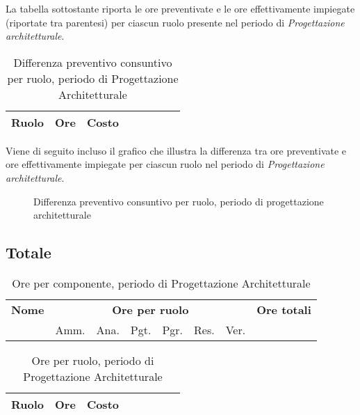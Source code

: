 La tabella sottostante riporta le ore preventivate e le ore effettivamente impiegate (riportate tra parentesi) per ciascun ruolo presente nel periodo di \textit{Progettazione architetturale}.

\begin{table}[H]
\begin{tabular}{lccccccc}
\toprule
    \textbf{Ruolo}  & \textbf{Ore} & \textbf{Costo} \\
    \midrule
    
    	
    
    \bottomrule
\end{tabular}
\caption{Differenza preventivo consuntivo per ruolo, periodo di Progettazione Architetturale}
\end{table}

Viene di seguito incluso il grafico che illustra la differenza tra ore preventivate e ore effettivamente impiegate per ciascun ruolo nel periodo di \textit{Progettazione architetturale}.

\begin{center}
\begin{figure}[H]
\caption{Differenza preventivo consuntivo per ruolo, periodo di progettazione architetturale}
\end{figure}
\end{center}

\subsection{Totale}

\begin{table}[H]
\begin{tabular}{lccccccc}
\toprule
    \textbf{Nome}  & \multicolumn{6}{c}{\textbf{Ore per ruolo}} & \textbf{Ore totali} \\
     & Amm. & Ana. & Pgt. & Pgr. & Res. & Ver. & \\
    \midrule
    
    	
    
    \bottomrule
\end{tabular}

\caption{Ore per componente, periodo di Progettazione Architetturale}
\end{table}

\begin{table}[H]
\begin{tabular}{lccccccc}
\toprule
    \textbf{Ruolo}  & \textbf{Ore} & \textbf{Costo} \\
    \midrule
    
    	
    
    \bottomrule
\end{tabular}
\caption{Ore per ruolo, periodo di Progettazione Architetturale}
\end{table}